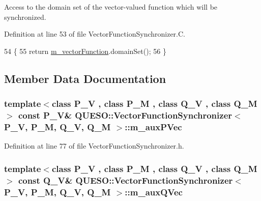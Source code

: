 Access to the domain set of the vector-\/valued function which will be synchronized. 



Definition at line 53 of file Vector\-Function\-Synchronizer.\-C.


\begin{DoxyCode}
54 \{
55   \textcolor{keywordflow}{return} \hyperlink{class_q_u_e_s_o_1_1_vector_function_synchronizer_abde0efa4a6ab11898d8b0b0853d0971a}{m\_vectorFunction}.domainSet();
56 \}
\end{DoxyCode}


\subsection{Member Data Documentation}
\hypertarget{class_q_u_e_s_o_1_1_vector_function_synchronizer_af93da0ecec2b078ddacc8135f81cd996}{
\subsubsection[{m\-\_\-aux\-P\-Vec}]{\setlength{\rightskip}{0pt plus 5cm}template$<$class P\-\_\-\-V , class P\-\_\-\-M , class Q\-\_\-\-V , class Q\-\_\-\-M $>$ const P\-\_\-\-V\& {\bf Q\-U\-E\-S\-O\-::\-Vector\-Function\-Synchronizer}$<$ P\-\_\-\-V, P\-\_\-\-M, Q\-\_\-\-V, Q\-\_\-\-M $>$\-::m\-\_\-aux\-P\-Vec\hspace{0.3cm}{\ttfamily [private]}}}\label{class_q_u_e_s_o_1_1_vector_function_synchronizer_af93da0ecec2b078ddacc8135f81cd996}


Definition at line 77 of file Vector\-Function\-Synchronizer.\-h.

\hypertarget{class_q_u_e_s_o_1_1_vector_function_synchronizer_a4fc0f69d67bfcfc200484bb741a2b75d}{
\subsubsection[{m\-\_\-aux\-Q\-Vec}]{\setlength{\rightskip}{0pt plus 5cm}template$<$class P\-\_\-\-V , class P\-\_\-\-M , class Q\-\_\-\-V , class Q\-\_\-\-M $>$ const Q\-\_\-\-V\& {\bf Q\-U\-E\-S\-O\-::\-Vector\-Function\-Synchronizer}$<$ P\-\_\-\-V, P\-\_\-\-M, Q\-\_\-\-V, Q\-\_\-\-M $>$\-::m\-\_\-aux\-Q\-Vec\hspace{0.3cm}{\ttfamily [private]}}}\label{class_q_u_e_s_o_1_1_vector_function_synchronizer_a4fc0f69d67bfcfc200484bb741a2b75d}


